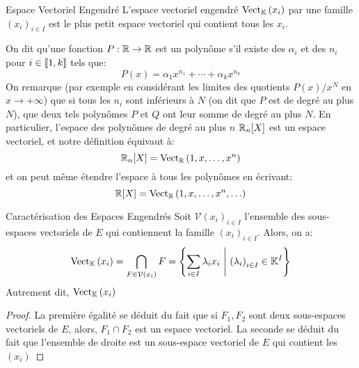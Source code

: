 \documentclass{classe}
\renewcommand*{\K}{\mathbb{K}}
\begin{document}
\begin{définition}{Espace Vectoriel Engendré}{}
	L'espace vectoriel engendré $\Vect_{\K}\left( x_{i} \right)$ par une famille $\left( x_{i}\right)_{i\in I}$ est le plus petit espace vectoriel qui contient tous les $x_{i}$.
\end{définition}

\begin{example}
	On dit qu'une fonction $P: \mathbb{R} \to \mathbb{R}$ est un polynôme s'il existe des $\alpha_{i}$ et des $n_{i}$ pour $i \in \left\llbracket 1, k\right\rrbracket$ tels que:
	\begin{equation*}
		P(x) = \alpha_{1}x^{n_{1}} + \cdots + \alpha_{k}x^{n_{k}}
	\end{equation*}
	On remarque (par exemple en considérant les limites des quotients $P(x)/x^{N}$ en $x \to +\infty$) que si tous les $n_{i}$ sont inférieurs à $N$ (on dit que $P$ est de degré au plus $N$), que deux tels polynômes $P$ et $Q$ ont leur somme de degré au plus $N$.
	En particulier, l'espace des polynômes de degré au plus $n$ $\mathbb{R}_{n}[X]$ est un espace vectoriel, et notre définition équivaut à:
	\begin{equation*}
		\mathbb{R}_{n}[X] = \operatorname{Vect}_{\mathbb{R}}\left( 1, x, \ldots, x^{n} \right)
	\end{equation*}
	et on peut même étendre l'espace à tous les polynômes en écrivant:
	\begin{equation*}
		\mathbb{R}[X] = \operatorname{Vect}_{\mathbb{R}}\left( 1, x, \ldots, x^{n}, \ldots \right)
	\end{equation*}
\end{example}

\begin{propositionfr}{Caractérisation des Espaces Engendrés}{}
	Soit $\mathcal{V}\left( x_{i} \right)_{i\in I}$ l'ensemble des sous-espaces vectoriels de $E$ qui contiennent la famille $\left(x_{i}\right)_{i\in I}$.
	Alors, on a:
	\begin{equation*}
		\Vect_{\K}\left( x_{i} \right) = \bigcap_{F \in \mathcal{V}\left( x_{i} \right)} F = \left\{ \sum_{i\in I}\lambda_{i}x_{i}\ \middle| \ \left(\lambda_{i}\right)_{i\in I} \in \K^{I}\right\}
	\end{equation*}
	Autrement dit, $\Vect_{\K}\left( x_{i} \right)$
\end{propositionfr}
\begin{proof}
	La première égalité se déduit du fait que si $F_{1}, F_{2}$ sont deux sous-espaces vectoriels de $E$, alors, $F_{1} \cap F_{2}$ est un espace vectoriel.
	La seconde se déduit du fait que l'ensemble de droite est un sous-espace vectoriel de $E$ qui contient les $\left( x_{i} \right)$
\end{proof}
\end{document}
